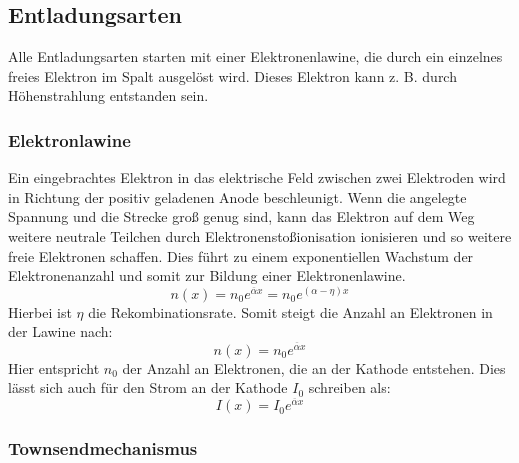 \subsection{Entladungsarten}
Alle Entladungsarten starten mit einer Elektronenlawine, die durch ein einzelnes freies Elektron im Spalt ausgelöst wird. Dieses Elektron kann z. B. durch Höhenstrahlung entstanden sein.
\subsubsection{Elektronlawine}
\label{chap:electronlaw}
Ein eingebrachtes Elektron in das elektrische Feld zwischen zwei Elektroden wird in Richtung der positiv geladenen Anode beschleunigt. Wenn die angelegte Spannung und die Strecke groß genug sind, kann das Elektron auf dem Weg weitere neutrale Teilchen durch Elektronenstoßionisation ionisieren und so weitere freie Elektronen schaffen. Dies führt zu einem exponentiellen Wachstum der Elektronenanzahl und somit zur Bildung einer Elektronenlawine. \cite{kuffel2000}
\begin{equation}
    n(x) = n_0 e^{\overline{\alpha}x} = n_0 e^{(\alpha - \eta)x}
    \label{eq:electronlaw}
\end{equation}
Hierbei ist \(\eta\) die Rekombinationsrate. Somit steigt die Anzahl an Elektronen in der Lawine nach:
\begin{equation}
    n(x) = n_0e^{\overline{\alpha}x}
\end{equation}
Hier entspricht \(n_0\) der Anzahl an Elektronen, die an der Kathode entstehen. Dies lässt sich auch für den Strom an der Kathode \(I_0\) schreiben als:
\begin{equation}
    I(x) = I_0e^{\overline{\alpha}x}
\end{equation}

\subsubsection{Townsendmechanismus}

